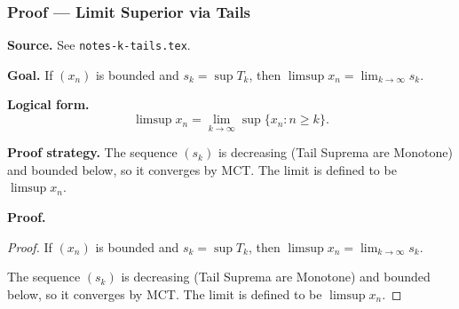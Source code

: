 
\clearpage
{}
\hypertarget{proof-RA-ABB-T-limsup-via-tails}{}

\subsubsection[Limit Superior via Tails]{Proof --- Limit Superior via Tails}

\bigskip

\noindent
\textbf{Source.}
See \texttt{notes-k-tails.tex}.

\vspace{0.75em}

\noindent
\textbf{Goal.}
If $(x_n)$ is bounded and $s_k = \sup T_k$, then $\limsup x_n = \lim_{k \to \infty} s_k$.

\vspace{0.75em}

\noindent
\textbf{Logical form.}
\[
  \limsup x_n = \lim_{k \to \infty} \sup\{x_n : n \ge k\}.
\]

\vspace{0.75em}

\noindent
\textbf{Proof strategy.}
The sequence $(s_k)$ is decreasing (Tail Suprema are Monotone) and bounded below, so it converges by MCT. The limit is defined to be $\limsup x_n$.

\vspace{0.75em}

\noindent
\textbf{Proof.}
\begin{proof}
\Claim If $(x_n)$ is bounded and $s_k = \sup T_k$, then $\limsup x_n = \lim_{k \to \infty} s_k$.

\Given 

\Goal 

\Strategy The sequence $(s_k)$ is decreasing (Tail Suprema are Monotone) and bounded below, so it converges by MCT. The limit is defined to be $\limsup x_n$.

\medskip


\end{proof}

